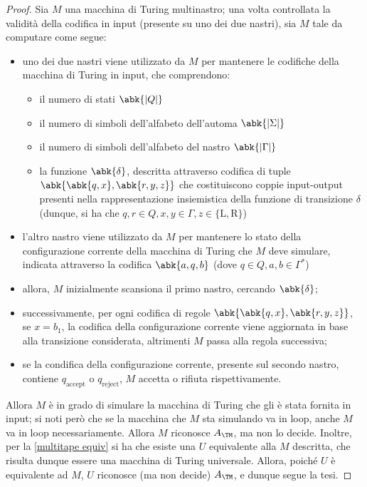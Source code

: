 \documentclass[a4paper, 12pt]{report}
\begin{document}
    \begin{proof}
        Sia $M$ una macchina di Turing multinastro; una volta controllata la validità della codifica in input (presente su uno dei due nastri), sia $M$ tale da computare come segue:

        \begin{itemize}
            \item uno dei due nastri viene utilizzato da $M$ per mantenere le codifiche della macchina di Turing in input, che comprendono:
                \begin{itemize}
                    \item il numero di stati $\abk{|Q|}$
                    \item il numero di simboli dell'alfabeto dell'automa $\abk{|\Sigma|}$
                    \item il numero di simboli dell'alfabeto del nastro $\abk{|\Gamma|}$
                    \item la funzione $\abk{\delta}$, descritta attraverso codifica di tuple $\abk{\abk{q, x}, \abk{r, y, z}}$ che costituiscono coppie input-output presenti nella rappresentazione insiemistica della funzione di transizione $\delta$ (dunque, si ha che $q, r \in Q, x, y \in \Gamma, z \in \{\mathrm L ,\mathrm R\}$)
                \end{itemize}
            \item l'altro nastro viene utilizzato da $M$ per mantenere lo stato della configurazione corrente della macchina di Turing che $M$ deve simulare, indicata attraverso la codifica $\abk{a, q, b}$ (dove $q \in Q, a, b \in \Gamma^*$)
            \item allora, $M$ inizialmente scansiona il primo nastro, cercando $\abk{\delta}$;
            \item successivamente, per ogni codifica di regole $\abk{\abk{q, x}, \abk{r, y, z}}$, se $x = b_1$, la codifica della configurazione corrente viene aggiornata in base alla transizione considerata, altrimenti $M$ passa alla regola successiva;
            \item se la condifica della configurazione corrente, presente sul secondo nastro, contiene $q_\mathrm{accept}$ o $q_\mathrm{reject}$, $M$ accetta o rifiuta rispettivamente.
        \end{itemize}

        Allora $M$ è in grado di simulare la macchina di Turing che gli è stata fornita in input; si noti però che se la macchina che $M$ sta simulando va in loop, anche $M$ va in loop necessariamente. Allora $M$ riconosce $A_\TM$, ma non lo decide. Inoltre, per la \cref{multitape equiv} si ha che esiste una \TM $U$ equivalente alla $M$ descritta, che risulta dunque essere una macchina di Turing universale. Allora, poiché $U$ è equivalente ad $M$, $U$ riconosce (ma non decide) $A_\TM$, e dunque segue la tesi.
    \end{proof}
\end{document}
